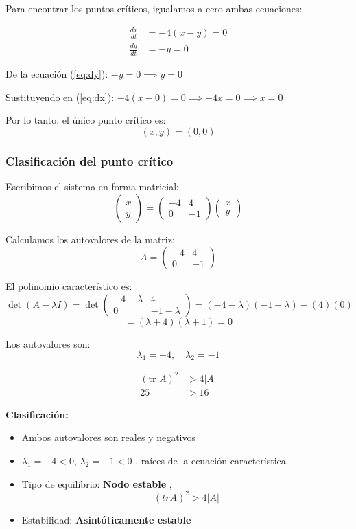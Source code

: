 \documentclass[a4paper,10pt]{article}
\begin{document}
Para encontrar los puntos críticos, igualamos a cero ambas ecuaciones:

\begin{align}
	\frac{dx}{dt} &= -4(x - y) = 0 \label{eq:dx} \\
	\frac{dy}{dt} &= -y = 0 \label{eq:dy}
\end{align}

De la ecuación (\ref{eq:dy}): $-y = 0 \implies y = 0$

Sustituyendo en (\ref{eq:dx}): $-4(x - 0) = 0 \implies -4x = 0 \implies x = 0$

Por lo tanto, el único punto crítico es:
\[
(x, y) = (0, 0)
\]

\subsubsection*{Clasificación del punto crítico}

Escribimos el sistema en forma matricial:
\[
\begin{pmatrix}
\dot{x} \\ \dot{y}
\end{pmatrix}
=
\begin{pmatrix}
-4 & 4 \\
0 & -1
\end{pmatrix}
\begin{pmatrix}
x \\ y
\end{pmatrix}
\]

Calculamos los autovalores de la matriz:
\[
A = \begin{pmatrix}
-4 & 4 \\
0 & -1
\end{pmatrix}
\]

El polinomio característico es:
\[
\det(A - \lambda I) = \det\begin{pmatrix}
-4-\lambda & 4 \\
0 & -1-\lambda
\end{pmatrix} = (-4-\lambda)(-1-\lambda) - (4)(0)
\]
\[
= (\lambda + 4)(\lambda + 1) = 0
\]

Los autovalores son:
\[
\lambda_1 = -4, \quad \lambda_2 = -1
\]

\begin{align}
	(\text{tr } A)^{2} &> 4 |A| \\
	25 &> 16
\end{align}

	\textbf{Clasificación:}
\begin{itemize}
	\item Ambos autovalores son reales y negativos
	\item $\lambda_1 = -4 < 0$, $\lambda_2 = -1 < 0$ , raíces de la ecuación característica.
	\item Tipo de equilibrio: \textbf{Nodo estable} , \[(tr A)^2 > 4 |A| \]
	\item Estabilidad: \textbf{Asintóticamente estable}
\end{itemize}
\end{document}
